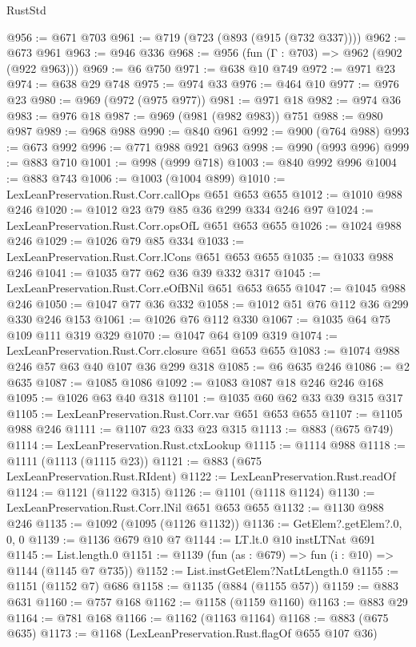 \begin{lexlean}{RustStd}
\begin{coremodule}
{\begin{coremodule}
{{{{{{{{{{@956 := @671 @703
@961 := @719 (@723 (@893 (@915 (@732 @337))))
@962 := @673 @961
@963 := @946 @336
@968 := @956 (fun (Γ : @703) => @962 (@902 (@922 @963)))
@969 := @6 @750
@971 := @638 @10 @749
@972 := @971 @23
@974 := @638 @29 @748
@975 := @974 @33
@976 := @464 @10
@977 := @976 @23
@980 := @969 (@972 (@975 @977))
@981 := @971 @18
@982 := @974 @36
@983 := @976 @18
@987 := @969 (@981 (@982 @983)) @751
@988 := @980 @987
@989 := @968 @988
@990 := @840 @961
@992 := @900 (@764 @988)
@993 := @673 @992
@996 := @771 @988 @921 @963
@998 := @990 (@993 @996)
@999 := @883 @710
@1001 := @998 (@999 @718)
@1003 := @840 @992 @996
@1004 := @883 @743
@1006 := @1003 (@1004 @899)
@1010 := LexLeanPreservation.Rust.Corr.callOps @651 @653 @655
@1012 := @1010 @988 @246
@1020 := @1012 @23 @79 @85 @36 @299 @334 @246 @97
@1024 := LexLeanPreservation.Rust.Corr.opsOfL @651 @653 @655
@1026 := @1024 @988 @246
@1029 := @1026 @79 @85 @334
@1033 := LexLeanPreservation.Rust.Corr.lCons @651 @653 @655
@1035 := @1033 @988 @246
@1041 := @1035 @77 @62 @36 @39 @332 @317
@1045 := LexLeanPreservation.Rust.Corr.eOfBNil @651 @653 @655
@1047 := @1045 @988 @246
@1050 := @1047 @77 @36 @332
@1058 := @1012 @51 @76 @112 @36 @299 @330 @246 @153
@1061 := @1026 @76 @112 @330
@1067 := @1035 @64 @75 @109 @111 @319 @329
@1070 := @1047 @64 @109 @319
@1074 := LexLeanPreservation.Rust.Corr.closure @651 @653 @655
@1083 := @1074 @988 @246 @57 @63 @40 @107 @36 @299 @318
@1085 := @6 @635 @246
@1086 := @2 @635
@1087 := @1085 @1086
@1092 := @1083 @1087 @18 @246 @246 @168
@1095 := @1026 @63 @40 @318
@1101 := @1035 @60 @62 @33 @39 @315 @317
@1105 := LexLeanPreservation.Rust.Corr.var @651 @653 @655
@1107 := @1105 @988 @246
@1111 := @1107 @23 @33 @23 @315
@1113 := @883 (@675 @749)
@1114 := LexLeanPreservation.Rust.ctxLookup
@1115 := @1114 @988
@1118 := @1111 (@1113 (@1115 @23))
@1121 := @883 (@675 LexLeanPreservation.Rust.RIdent)
@1122 := LexLeanPreservation.Rust.readOf
@1124 := @1121 (@1122 @315)
@1126 := @1101 (@1118 @1124)
@1130 := LexLeanPreservation.Rust.Corr.lNil @651 @653 @655
@1132 := @1130 @988 @246
@1135 := @1092 (@1095 (@1126 @1132))
@1136 := GetElem?.getElem?.{0, 0, 0}
@1139 := @1136 @679 @10 @7
@1144 := LT.lt.{0} @10 instLTNat @691
@1145 := List.length.{0}
@1151 := @1139 (fun (as : @679) => fun (i : @10) => @1144 (@1145 @7 @735))
@1152 := List.instGetElem?NatLtLength.{0}
@1155 := @1151 (@1152 @7) @686
@1158 := @1135 (@884 (@1155 @57))
@1159 := @883 @631
@1160 := @757 @168
@1162 := @1158 (@1159 @1160)
@1163 := @883 @29
@1164 := @781 @168
@1166 := @1162 (@1163 @1164)
@1168 := @883 (@675 @635)
@1173 := @1168 (LexLeanPreservation.Rust.flagOf @655 @107 @36)
}}}}}}}}}}
\end{coremodule}}
\end{coremodule}
\end{lexlean}
